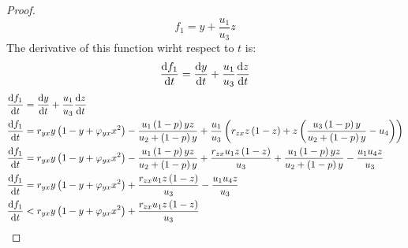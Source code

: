 \begin{proof}
    \begin{equation*}
        f_1 = y + \frac{u_1}{u_3}z
    \end{equation*}
    The derivative of this function wirht respect to $t$ is:
    \begin{equation*}
        \diff[]{f_1}{t} = \diff[]{y}{t} + \frac{u_1}{u_3}\diff[]{z}{t}
    \end{equation*}
    \begin{align*}
        \diff[]{f_1}{t} &= \diff[]{y}{t} + \frac{u_1}{u_3}\diff[]{z}{t}\\
        \diff[]{f_1}{t} &= r_{yx}y\left(1-y+\varphi_{yx}x^2\right)-\frac{u_1\left(1-p\right)yz}{u_2+\left(1-p\right)y}+\frac{u_1}{u_3}\left(r_{zx}z\left(1-z\right)+z\left(\frac{u_3\left(1-p\right)y}{u_2+\left(1-p\right)y}-u_4\right)\right)\\
        \diff[]{f_1}{t} &= r_{yx}y\left(1-y+\varphi_{yx}x^2\right)-\frac{u_1\left(1-p\right)yz}{u_2+\left(1-p\right)y}+\frac{r_{zx}u_1z\left(1-z\right)}{u_3}+\frac{u_1\left(1-p\right)yz}{u_2+\left(1-p\right)y}-\frac{u_1u_4z}{u_3}\\
        \diff[]{f_1}{t} &= r_{yx}y\left(1-y+\varphi_{yx}x^2\right)+\frac{r_{zx}u_1z\left(1-z\right)}{u_3}-\frac{u_1u_4z}{u_3}\\
        \diff[]{f_1}{t} &< r_{yx}y\left(1-y+\varphi_{yx}x^2\right)+\frac{r_{zx}u_1z\left(1-z\right)}{u_3}
    \end{align*}
\end{proof}